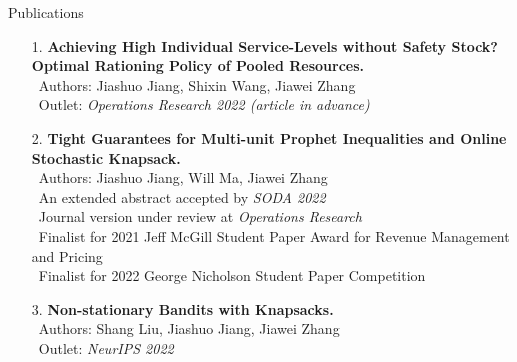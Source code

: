 \documentclass{resume} %
\begin{document}
\begin{rSection}{Publications}

\begin{enumerate}

\item[1.] \textbf{Achieving High Individual Service-Levels without Safety Stock? Optimal Rationing Policy of Pooled Resources.}\label{P3} \\
\small
 \ Authors: Jiashuo Jiang, Shixin Wang, Jiawei Zhang \\
 \ Outlet: \textit{Operations Research 2022 (article in advance)}
\normalsize

\item[2.] \textbf{Tight Guarantees for Multi-unit Prophet Inequalities and Online Stochastic Knapsack.}\label{P1} \\
\small
 \ Authors: Jiashuo Jiang, Will Ma, Jiawei Zhang \\
 \ An extended abstract accepted by \textit{SODA 2022} \\
 \ Journal version under review at \textit{Operations Research}\\
 \ Finalist for 2021 Jeff McGill Student Paper Award for Revenue Management and Pricing\\
 \ Finalist for 2022 George Nicholson Student Paper Competition
\normalsize

\item[3.] \textbf{Non-stationary Bandits with Knapsacks.}\label{P5} \\
\small
 \ Authors: Shang Liu, Jiashuo Jiang, Jiawei Zhang \\
 \ Outlet: \textit{NeurIPS 2022}
\normalsize

\end{enumerate}

\end{rSection}
\vspace{0.3cm}
\end{document}
